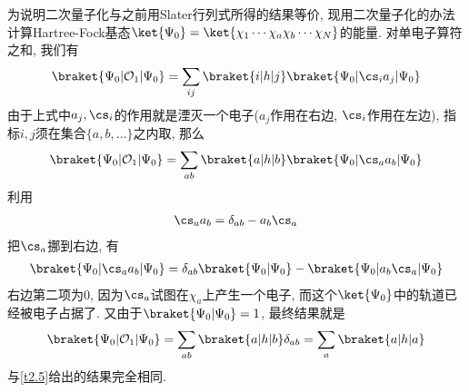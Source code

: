 
为说明二次量子化与之前用Slater行列式所得的结果等价, 
现用二次量子化的办法计算Hartree-Fock基态$\ket{\Psi_0} = \ket{\chi_1\cdots\chi_a\chi_b\cdots\chi_N}$的能量. 
对单电子算符之和, 
我们有
\begin{align}
\braket{\Psi_0|\mathcal{O}_1|\Psi_0} = \sum_{ij}\braket{i|h|j}\braket{\Psi_0|\cs_i a_j|\Psi_{0}}
\end{align}
由于上式中$a_j,\cs_i$的作用就是湮灭一个电子($a_j$作用在右边, 
$\cs_i$作用在左边), 
指标$i,j$须在集合$\{a,b,\ldots\}$之内取, 
那么
\begin{align}
\braket{\Psi_0|\mathcal{O}_1|\Psi_0} = \sum_{ab}\braket{a|h|b}\braket{\Psi_0|\cs_a a_b|\Psi_{0}}
\end{align}
利用
\begin{align}
\cs_a a_b = \delta_{ab} - a_b\cs_a \notag
\end{align}
把$\cs_a$挪到右边, 
有
\begin{align}
\braket{\Psi_0|\cs_a a_b|\Psi_0} = \delta_{ab}\braket{\Psi_0|\Psi_0} - \braket{\Psi_0|a_b\cs_a|\Psi_0}
\end{align}
右边第二项为$0$, 
因为$\cs_a$试图在$\chi_a$上产生一个电子, 
而这个$\ket{\Psi_0}$中的轨道已经被电子占据了. 
又由于$\braket{\Psi_0|\Psi_0} = 1$, 
最终结果就是
\begin{align}
\braket{\Psi_0|\mathcal{O}_1|\Psi_0} = \sum_{ab} \braket{a|h|b}\delta_{ab} = \sum_a\braket{a|h|a}
\end{align} 
与\autoref{t2.5}给出的结果完全相同.


